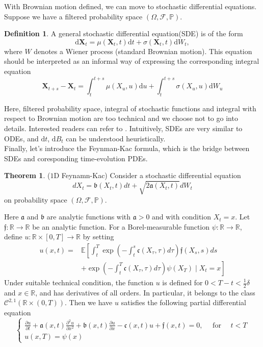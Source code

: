 \documentclass[11pt]{article}
\theoremstyle{definition}
\newtheorem{definition}{Definition}
\newtheorem{theorem}{Theorem}[section]
\begin{document}
With Brownian motion defined, we can move to stochastic differential equations. Suppose we have a filtered probability space $\left( \Omega,\mathcal{F},\mathbb{P}\right)$.
\begin{definition}
    A general stochastic differential equation(SDE) is of the form
$$
\mathrm{d} \textbf{X}_t=\mu\left(\textbf{X}_t, t\right) \mathrm{d} t+\sigma\left( \textbf{X}_t, t\right) \mathrm{d} W_t,
$$
where $W$ denotes a Wiener process (standard Brownian motion). This equation should be interpreted as an informal way of expressing the corresponding integral equation
$$
\textbf{X}_{t+s}-\textbf{X}_t=\int_t^{t+s} \mu\left(X_u, u\right) \mathrm{d} u+\int_t^{t+s} \sigma\left(X_u, u\right) \mathrm{d} W_u
$$
\end{definition}

Here, filtered probability space, integral of stochastic functions and integral with respect to Brownian motion are too technical and we choose not to go into details. Interested readers can refer to \cite{e_applied_2019}. Intuitively, SDEs are very similar to ODEs, and $\mathrm{d} t$, $\mathrm{d} B_t$ can be understood heuristically.\\

Finally, let's introduce the Feynman-Kac formula, which is the bridge between SDEs and coresponding time-evolution PDEs.
\begin{theorem}($1$D Feynamn-Kac)
Consider a stochastic differential equation
$$
d X_t=\mathfrak{b}\left(X_t, t\right) d t+\sqrt{2 \mathfrak{a}\left(X_t, t\right)} d W_t
$$ on probability space $(\Omega, \mathcal{F}, \mathbb{P})$.

Here $\mathfrak{a}$ and $\mathfrak{b}$ are  analytic functions with $\mathfrak{a}>0$ and with condition $X_t=x$.  Let $\mathfrak{f}: \mathbb{R} \rightarrow \mathbb{R}$ be an analytic function. For a Borel-measurable function $\psi: \mathbb{R} \rightarrow \mathbb{R}$, define $u: \mathbb{R} \times[0, T] \rightarrow \mathbb{R}$ by setting
$$
\begin{aligned}
u(x, t)= & \mathbb{E}\left[\int_t^T \exp \left(-\int_t^s \mathfrak{c}\left(X_\tau, \tau\right) d \tau\right) \mathfrak{f}\left(X_s, s\right) d s\right. \\
& \left.+\exp \left(-\int_t^T \mathfrak{c}\left(X_\tau, \tau\right) d \tau\right) \psi\left(X_T\right) \mid X_t=x\right]
\end{aligned}
$$
Under suitable technical condition,
the function $u$ is defined for $0<T-t<\frac{1}{2} \delta$ and $x \in \mathbb{R}$, and has derivatives of all orders. In particular, it belongs to the class $\mathcal{C}^{2,1}(\mathbb{R} \times(0, T))$. Then we have $u$ satisfies the following partial differential equation
$$
\left\{\begin{array}{l}
\frac{\partial u}{\partial t}+\mathfrak{a}(x, t) \frac{\partial^2 u}{\partial x^2}+\mathfrak{b}(x, t) \frac{\partial u}{\partial x}-\mathfrak{c}(x, t) u+\mathfrak{f}(x, t)=0, \quad \text { for } \quad t<T \\
u(x, T)=\psi(x)
\end{array}\right.
$$



\end{theorem}
\end{document}
